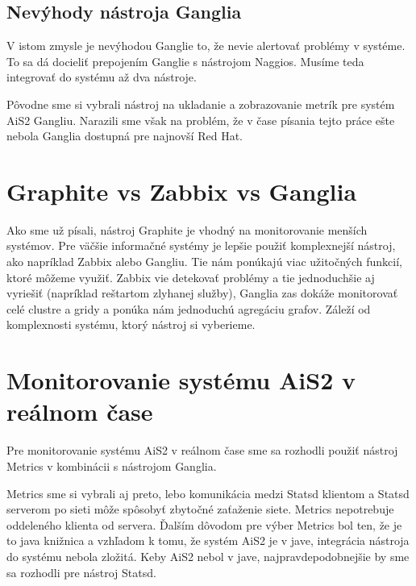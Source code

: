 \documentclass[a4paper, upjsfrontpage, thesismargins, thesislinespacing]{rnthesis}
\begin{document}
\subsection{Nevýhody nástroja Ganglia}

V istom zmysle je nevýhodou Ganglie to, že nevie alertovať problémy v systéme.
To sa dá docieliť prepojením Ganglie s nástrojom Naggios.
Musíme teda integrovať do systému až dva nástroje.

Pôvodne sme si vybrali nástroj na ukladanie a zobrazovanie metrík pre systém AiS2 Gangliu.
Narazili sme však na problém, že v čase písania tejto práce ešte nebola Ganglia dostupná pre najnovší Red Hat.


\section{Graphite vs Zabbix vs Ganglia}

Ako sme už písali, nástroj Graphite je vhodný na monitorovanie menších systémov.
Pre väčšie informačné systémy je lepšie použiť komplexnejší nástroj, ako napríklad Zabbix alebo Gangliu.
Tie nám ponúkajú viac užitočných funkcií, ktoré môžeme využiť.
Zabbix vie detekovať problémy a tie jednoduchšie aj vyriešiť (napríklad reštartom zlyhanej služby), 
	Ganglia zas dokáže monitorovať celé clustre a gridy a ponúka nám jednoduchú agregáciu grafov.
Záleží od komplexnosti systému, ktorý nástroj si vyberieme.

\section{Monitorovanie systému AiS2 v reálnom čase}

Pre monitorovanie systému AiS2 v reálnom čase sme sa rozhodli použiť nástroj Metrics v kombinácii s nástrojom Ganglia.

Metrics sme si vybrali aj preto, lebo komunikácia medzi Statsd klientom a Statsd serverom po sieti môže spôsobyť zbytočné zaťaženie siete.
Metrics nepotrebuje oddeleného klienta od servera.
Ďalším dôvodom pre výber Metrics bol ten, že je to java knižnica a vzhľadom k tomu, že systém AiS2 je v jave, integrácia nástroja do systému nebola zložitá.
Keby AiS2 nebol v jave, najpravdepodobnejšie by sme sa rozhodli pre nástroj Statsd.
\end{document}
